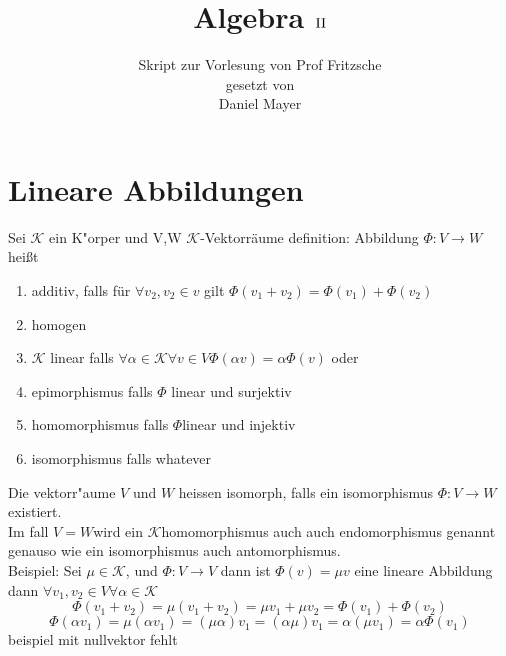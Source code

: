 \documentclass[11pt]{article}
\title{\textbf{Algebra $\RN{2}$}}
\author{Skript zur Vorlesung von Prof Fritzsche\\
		gesetzt von \\
		Daniel Mayer}
\date{}
\begin{document}
\maketitle

\section{Lineare Abbildungen}
Sei $\mathcal{K}$ ein  K"orper und V,W $\mathcal{K}$-Vektorräume
definition: Abbildung $\Phi : V \rightarrow W$ heißt 
\begin{enumerate}
 \item additiv, falls für $ \forall v_2, v_2 \in v$ gilt $\Phi(v_1+v_2)=\Phi(v_1)+\Phi(v_2)$
 \item homogen
 \item $\mathcal{K}$ linear falls $ \forall \alpha \in \mathcal{K} \forall v \in V \Phi (\alpha v)= \alpha\Phi (v)$ oder 
 \item epimorphismus falls $\Phi$ linear und surjektiv
 \item homomorphismus falls $\Phi $linear und injektiv
 \item isomorphismus falls whatever
\end{enumerate}

Die  vektorr"aume $V$ und $W$ heissen isomorph, falls ein isomorphismus $\Phi : V \rightarrow W$ existiert.\\
Im fall $V=W $wird ein $\mathcal{K}$homomorphismus auch auch endomorphismus genannt genauso wie ein isomorphismus auch antomorphismus.\\
Beispiel: Sei $\mu \in \mathcal{K}$, und $\Phi  : V \rightarrow V$ dann ist $\Phi (v) = \mu v$ eine lineare Abbildung dann 
$\forall v_1, v_2 \in V \forall \alpha \in \mathcal{K}$    
\[
  \Phi(v_1+v_2)= μ (v_1+v_2)= μ v_1 + μ v_2= \Phi(v_1)+\Phi(v_2)
\]
\[
  \Phi(\alpha v_1)=μ (\alpha v_1)= (μ\alpha)v_1=(\alpha μ)v_1= \alpha(μv_1)= \alpha\Phi(v_1)
\]
beispiel mit nullvektor fehlt
\end{document}
